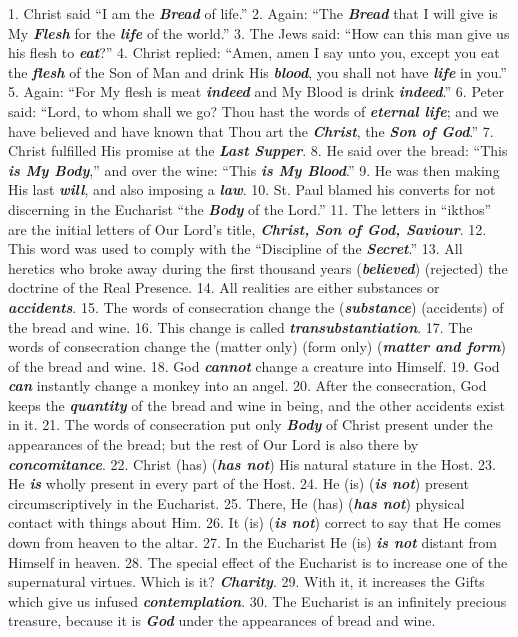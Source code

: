 \documentclass[a5paper]{article}
\newcommand\answer[1]{\textbf{\textit{#1}}}
\begin{document}
1. Christ said ``I am the \answer{Bread} of life.'' 2. Again: ``The \answer{Bread}  that  I
will give is My \answer{Flesh} for the \answer{life} of the world.'' 3. The  Jews  said:
``How can this man give us his flesh to \answer{eat}?'' 4. Christ replied:  ``Amen,
amen I say unto you, except you eat the \answer{flesh}  of  the  Son  of  Man  and
drink His \answer{blood}, you shall not have \answer{life} in you.'' 5.  Again:  ``For  My
flesh is meat \answer{indeed} and My Blood  is  drink  \answer{indeed}.''  6.  Peter  said:
“Lord, to whom shall we go? Thou hast the words of  \answer{eternal life};  and  we  have
believed and have known that  Thou  art  the  \answer{Christ},  the  \answer{Son of God}.”  7.
Christ fulfilled His promise at the \answer{Last Supper}. 8. He  said  over  the  bread:
“This \answer{is My Body},” and over the wine: “This \answer{is My Blood}.” 9. He was  then  making
His last \answer{will}, and also imposing a \answer{law}. 10.  St.  Paul  blamed  his
converts for not discerning in the Eucharist “the  \answer{Body}  of  the  Lord.”
11. The letters in “ikthos” are the initial letters  of  Our  Lord's  title,
\answer{Christ, Son of God, Saviour}. 12. This word was used to  comply  with  the  ``Discipline  of  the
\answer{Secret}.'' 13. All heretics who broke away during the  first  thousand  years
(\answer{believed}) (rejected) the doctrine of the Real Presence. 14.  All  realities
are either substances or \answer{accidents}. 15. The words of consecration change  the
(\answer{substance}) (accidents) of the bread and wine. 16.  This  change  is  called
\answer{transubstantiation}. 17. The words of  consecration  change  the  (matter  only)  (form
only) (\answer{matter and form}) of the  bread  and  wine.  18.  God  \answer{cannot}
change a creature into Himself. 19. God \answer{can}  instantly  change  a
monkey into an angel. 20. After the consecration, God keeps the \answer{quantity}  of
the bread and wine in being, and the other accidents exist in  it.  21.  The
words of  consecration  put  only  \answer{Body}  of  Christ  present  under  the
appearances of the bread; but  the  rest  of  Our  Lord  is  also  there  by
\answer{concomitance}. 22. Christ (has) (\answer{has not}) His natural stature in  the  Host.  23.
He \answer{is} wholly present in every part of the Host. 
24. He  (is)  (\answer{is not}) present circumscriptively in the Eucharist. 
25. There,  He  (has)  (\answer{has not}) physical contact with things about Him. 
26. It (is) (\answer{is not})  correct
to say that He comes down from heaven to the altar. 27. In the Eucharist  He
(is) \answer{is not} distant from Himself in heaven. 28. The special effect of  the
Eucharist is to increase one of  the  supernatural  virtues.  Which  is  it?
\answer{Charity}. 29. With  it,  it  increases  the  Gifts  which  give  us  infused
\answer{contemplation}. 30. The Eucharist is an infinitely precious treasure,  because  it
is \answer{God} under the appearances of bread and wine.
\end{document}
